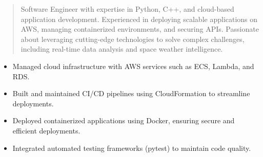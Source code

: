 



\makecvheader

\begin{quote}
  \noindent
  Software Engineer with expertise in Python, C++, and cloud-based application development. Experienced in deploying scalable applications on AWS, managing containerized environments, and securing APIs. Passionate about leveraging cutting-edge technologies to solve complex challenges, including real-time data analysis and space weather intelligence.
\end{quote}

\par\smallskip
\noindent
\begin{minipage}{20cm}
  \begin{minipage}{9.75cm}
    \begin{itemize}
      \item Managed cloud infrastructure with AWS services such as ECS, Lambda, and RDS.
      \item Built and maintained CI/CD pipelines using CloudFormation to streamline deployments.
    \end{itemize}
  \end{minipage}
  \hfill
  \begin{minipage}{9.75cm}
    \begin{itemize}
      \item Deployed containerized applications using Docker, ensuring secure and efficient deployments.
      \item Integrated automated testing frameworks (pytest) to maintain code quality.
    \end{itemize}
  \end{minipage}
\end{minipage}
\par\smallskip
\divider

